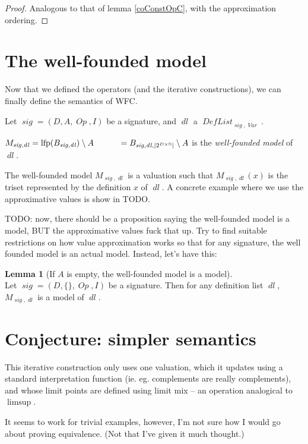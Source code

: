 \documentclass[oneside,12pt]{book}
\theoremstyle{definition}
\newtheorem{lemma}[theorem]{Lemma}
\theoremstyle{remark}
\newcommand\var[1]{\mathop{\mathit{#1}}\nolimits}
\newcommand{\sig}{\var{sig}}
\newcommand{\Op}{\var{Op}}
\newcommand{\Var}{\var{Var}}
\DeclareMathOperator{\lfp}{lfp}
\newcommand{\DefList}{\var{DefList}}
\newcommand{\dl}{\var{dl}}
\begin{document}
\begin{proof}
  Analogous to that of lemma \ref{coConstOpC}, with the approximation ordering.
\end{proof}

\section{The well-founded model}
Now that we defined the operators (and the iterative constructions),
we can finally define the semantics of WFC.

\begin{defBox}
  Let $\sig = (D, A, \Op, I)$ be a signature, and $\dl$ a $\DefList_{\sig,\Var}$.
  
  \medskip \noindent $M_{\sig,\dl} = \lfp(B_{\sig,\dl}) \setminus A \\
    \phantom{M_{\sig,\dl}} = B_{\sig,\dl,|2^{D \times \mathbb{N}}|} \setminus A$
  \phantom{aa} is the \textit{well-founded model} of $\dl$.
\end{defBox}

The well-founded model $M_{\sig,\dl}$ is a valuation such that $M_{\sig,\dl}(x)$
is the triset represented by the definition $x$ of $\dl$.
A concrete example where we use the approximative values is show in TODO.

TODO: now, there should be a proposition saying the well-founded model is a model,
BUT the approximative values fuck that up. Try to find suitable restrictions
on how value approximation works so that for any signature, the well founded
model is an actual model. Instead, let's have this:

\begin{lemma}[If $A$ is empty, the well-founded model is a model] \hfill \\
  Let $\sig = (D, \{\}, \Op, I)$ be a signature. Then for any definition list $\dl$,
  $M_{\sig,\dl}$ is a model of $\dl$.
\end{lemma}

\section{Conjecture: simpler semantics}
This iterative construction only uses one valuation, which it updates using a standard
interpretation function (ie. eg. complements are really complements), and whose limit
points are defined using limit mix -- an operation analogical to $\limsup$.

It seems to work for trivial examples, however, I'm not sure how I would go about
proving equivalence. (Not that I've given it much thought.)
\end{document}

